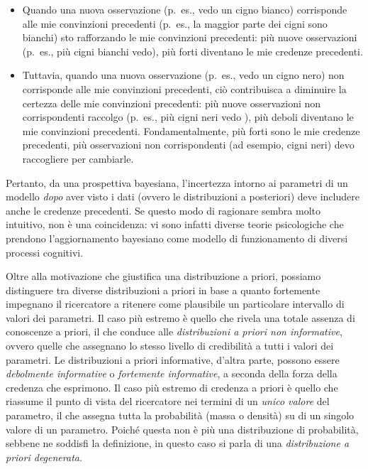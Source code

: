 \documentclass[
  11pt,
  italian,
  a4paper,
  extrafontsizes,onecolumn,openright
  ]{memoir}
\providecommand{\tightlist}{%
  \setlength{\itemsep}{0pt}\setlength{\parskip}{0pt}}
\begin{document}
\begin{itemize}
\tightlist
\item
  Quando una nuova osservazione (p.~es., vedo un cigno bianco) corrisponde alle mie convinzioni precedenti (p.~es., la maggior parte dei cigni sono bianchi) sto rafforzando le mie convinzioni precedenti: più nuove osservazioni (p.~es., più cigni bianchi vedo), più forti diventano le mie credenze precedenti.
\item
  Tuttavia, quando una nuova osservazione (p.~es., vedo un cigno nero) non corrisponde alle mie convinzioni precedenti, ciò contribuisca a diminuire la certezza delle mie convinzioni precedenti: più nuove osservazioni non corrispondenti raccolgo (p.~es., più cigni neri vedo ), più deboli diventano le mie convinzioni precedenti. Fondamentalmente, più forti sono le mie credenze precedenti, più osservazioni non corrispondenti (ad esempio, cigni neri) devo raccogliere per cambiarle.
\end{itemize}

Pertanto, da una prospettiva bayesiana, l'incertezza intorno ai parametri di un modello \emph{dopo} aver visto i dati (ovvero le distribuzioni a posteriori) deve includere anche le credenze precedenti. Se questo modo di ragionare sembra molto intuitivo, non è una coincidenza: vi sono infatti diverse teorie psicologiche che prendono l'aggiornamento bayesiano come modello di funzionamento di diversi processi cognitivi.

Oltre alla motivazione che giustifica una distribuzione a priori, possiamo distinguere tra diverse distribuzioni a priori in base a quanto fortemente impegnano il ricercatore a ritenere come plausibile un particolare intervallo di valori dei parametri. Il caso più estremo è quello che rivela una totale assenza di conoscenze a priori, il che conduce alle \emph{distribuzioni a priori non informative}, ovvero quelle che assegnano lo stesso livello di credibilità a tutti i valori dei parametri. Le distribuzioni a priori informative, d'altra parte, possono essere \emph{debolmente informative} o \emph{fortemente informative}, a seconda della forza della credenza che esprimono. Il caso più estremo di credenza a priori è quello che riassume il punto di vista del ricercatore nei termini di un \emph{unico valore} del parametro, il che assegna tutta la probabilità (massa o densità) su di un singolo valore di un parametro. Poiché questa non è più una distribuzione di probabilità, sebbene ne soddisfi la definizione, in questo caso si parla di una \emph{distribuzione a priori degenerata}.
\end{document}
